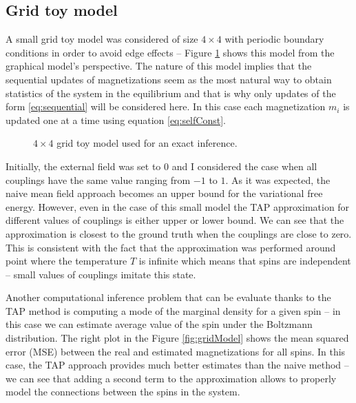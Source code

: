 \subsection{Grid toy model}
A small grid toy model was considered of size $4 \times 4$ with periodic boundary conditions in order to avoid edge effects -- Figure \ref{fig:grid} shows this model from the graphical model's perspective. The nature of this model implies that the sequential updates of magnetizations seem as the most natural way to obtain statistics of the system in the equilibrium and that is why only updates of the form \ref{eq:sequential} will be considered here. In this case each magnetization $m_i$ is updated one at a time using equation \ref{eq:selfConst}.

\begin{figure}[!htb]
\begin{center}

\end{center}
  \caption[1]{$4 \times 4$ grid toy model used for an exact inference.}
    \label{fig:grid}
\end{figure}

Initially, the external field was set to $0$ and I considered the case when all couplings have the same value ranging from $-1$ to $1$. As it was expected, the naive mean field approach becomes an upper bound for the variational free energy. However, even in the case of this small model the TAP approximation for different values of couplings is either upper or lower bound. We can see that the approximation is closest to the ground truth when the couplings are close to zero. This is consistent with the fact that the approximation was performed around point where the temperature $T$ is infinite which means that spins are independent -- small values of couplings imitate this state.

Another computational inference problem that can be evaluate thanks to the TAP method is computing a mode of the marginal density for a given spin -- in this case we can estimate average value of the spin under the Boltzmann distribution. The right plot in the Figure \ref{fig:gridModel} shows the mean squared error (MSE) between the real and estimated magnetizations for all spins. In this case, the TAP approach provides much better estimates than the naive method -- we can see that adding a second term to the approximation allows to properly model the connections between the spins in the system. 

